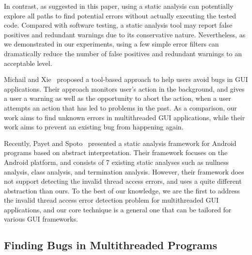 In contrast, as suggested in this paper,
using a static analysis can potentially explore
all paths to find potential errors without actually executing the tested code. 
Compared with software testing, a static analysis tool may
report false positives and redundant warnings due to its conservative nature.
Nevertheless, as we demonstrated in our experiments, using a few simple error
filters can dramatically reduce the number of false positives and redundant warnings to
an acceptable level.


Michail and Xie~\cite{michail05:helping} proposed a tool-based approach to help users avoid bugs
in GUI applications. Their approach monitors user's action in the background,
and gives a user a warning as well as the opportunity to abort the action, when
a user attempts an action that has led to problems in the past. 
As a comparison, our work aims to find unknown errors in multithreaded
GUI applications, while their work aims to prevent an existing bug
from happening again.


Recently, Payet and Spoto~\cite{Payet:2011:SAA:2032266.2032299} presented a static
analysis framework for Android programs based on  abstract
interpretation. Their framework focuses on the Android platform, and
 consists of 7 existing static analyses such as
nullness analysis, class analysis, and termination analysis.  However,
their framework does not support detecting the invalid thread access
errors, and uses a quite different abstraction than ours.
To the best of our knowledge, we are the first to address the invalid
thread access error detection problem for multithreaded GUI applications, and
our core technique is a general one that can be tailored for
various GUI frameworks.


\tinystep
\subsection{Finding Bugs in Multithreaded Programs}


